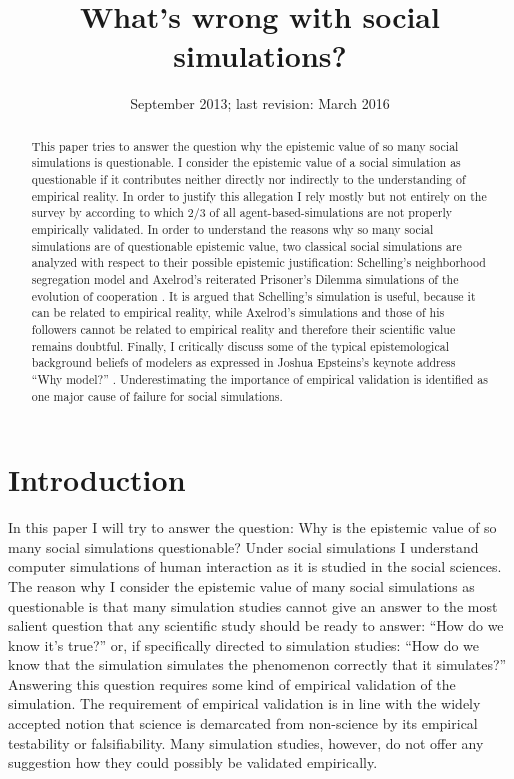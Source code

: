 \documentclass[12pt, english, a4paper]{article}
\begin{document}
\title{What's wrong with social simulations?}

\date{September 2013; last revision: March 2016}
 
\maketitle

\begin{abstract}
This paper tries to answer the question why the epistemic value of so
many social simulations is questionable. I consider the epistemic
value of a social simulation as questionable if it contributes neither
directly nor indirectly to the understanding of empirical reality. In
order to justify this allegation I rely mostly but not entirely on the
survey by \citet{heath-et-al:2009} according to which 2/3 of all
agent-based-simulations are not properly empirically validated.  In
order to understand the reasons why so many social simulations are of
questionable epistemic value, two classical social simulations are
analyzed with respect to their possible epistemic justification:
Schelling’s neighborhood segregation model \citep{schelling:1971} and
Axelrod’s reiterated Prisoner’s Dilemma simulations of the evolution
of cooperation \citep{axelrod:1984}. It is argued that Schelling’s
simulation is useful, because it can be related to empirical reality,
while Axelrod’s simulations and those of his followers cannot be
related to empirical reality and therefore their scientific value
remains doubtful. Finally, I critically discuss some of the typical
epistemological background beliefs of modelers as expressed in Joshua
Epsteins’s keynote address ``Why model?''
\citep{epstein:2008}. Underestimating the importance of empirical
validation is identified as one major cause of failure for social
simulations.
\end{abstract}

\newpage

\tableofcontents

\section{Introduction}

In this paper I will try to answer the question: Why is the epistemic
value of so many social simulations questionable? Under social
simulations I understand computer simulations of human interaction as
it is studied in the social sciences. The reason why I consider the
epistemic value of many social simulations as questionable is that
many simulation studies cannot give an answer to the most salient
question that any scientific study should be ready to answer: “How do
we know it’s true?” or, if specifically directed to simulation
studies: “How do we know that the simulation simulates the phenomenon
correctly that it simulates?” Answering this question requires some
kind of empirical validation of the simulation. The requirement of
empirical validation is in line with the widely accepted notion that
science is demarcated from non-science by its empirical testability or
falsifiability. Many simulation studies, however, do not offer any
suggestion how they could possibly be validated empirically.
\end{document}
